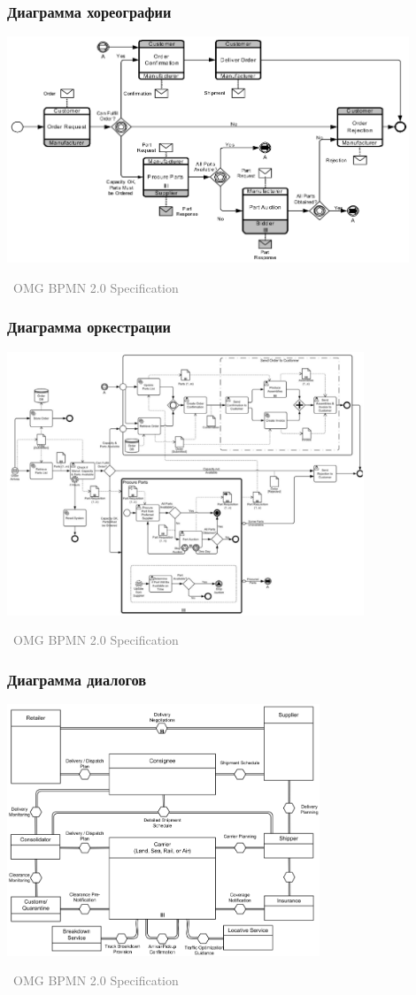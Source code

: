 \documentclass[xetex,mathserif,serif]{beamer}
\newcommand{\attribution}[1] {
	\vspace{-5mm}\begin{flushright}\begin{scriptsize}\textcolor{gray}{\textcopyright\, #1}\end{scriptsize}\end{flushright}
}
\begin{document}
	\begin{frame}
		\frametitle{Диаграмма хореографии}
		\begin{center}
			\includegraphics[width=0.9\textwidth]{bpmnChoreography.png}
			\attribution{OMG BPMN 2.0 Specification}
		\end{center}
	\end{frame}

	\begin{frame}
		\frametitle{Диаграмма оркестрации}
		\begin{center}
			\includegraphics[width=0.8\textwidth]{bpmnOrchestration.png}
			\attribution{OMG BPMN 2.0 Specification}
		\end{center}
	\end{frame}

	\begin{frame}
		\frametitle{Диаграмма диалогов}
		\begin{center}
			\includegraphics[width=0.7\textwidth]{bpmnConversation.png}
			\attribution{OMG BPMN 2.0 Specification}
		\end{center}
	\end{frame}
\end{document}
